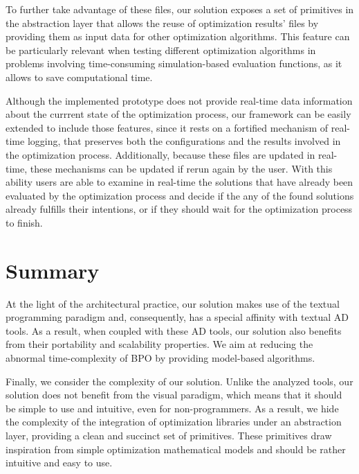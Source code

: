 To further take advantage of these files, our solution exposes a set of primitives in the abstraction layer that allows the reuse of optimization results' files by providing them as input data for other optimization algorithms. This feature can be particularly relevant when testing different optimization algorithms in problems involving time-consuming simulation-based evaluation functions, as it allows to save computational time.


Although the implemented prototype does not provide real-time data information about the currrent state of the optimization process, our framework can be easily extended to include those features, since it rests on a fortified mechanism of real-time logging, that preserves both the configurations and the results involved in the optimization process. Additionally, because these files are updated in real-time, these mechanisms can be updated if rerun again by the user. With this ability users are able to examine in real-time the solutions that have already been evaluated by the optimization process and decide if the any of the found solutions already fulfills their intentions, or if they should wait for the optimization process to finish. 




\section{Summary}

At the light of the architectural practice, our solution makes use of the textual programming paradigm and, consequently, has a special affinity with textual \ac{AD} tools. As a result, when coupled with these \ac{AD} tools, our solution also benefits from their portability and scalability properties. We aim at reducing the abnormal time-complexity of \ac{BPO} by providing model-based algorithms. 

Finally, we consider the complexity of our solution. Unlike the analyzed tools, our solution does not benefit from the visual paradigm, which means that it should be simple to use and intuitive, even for non-programmers. As a result, we hide the complexity of the integration of optimization libraries under an abstraction layer, providing a clean and succinct set of primitives. These primitives draw inspiration from simple optimization mathematical models and should be rather intuitive and easy to use. 

